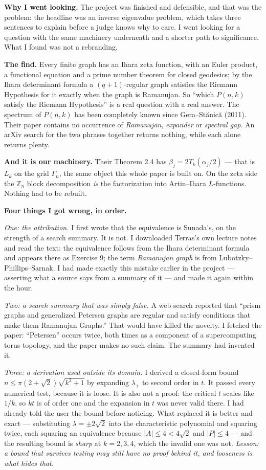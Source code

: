 \documentclass[12pt]{article}
\begin{document}
\textbf{Why I went looking.} The project was finished and defensible, and that
was the problem: the headline was an inverse eigenvalue problem, which takes
three sentences to explain before a judge knows why to care. I went looking for
a question with the same machinery underneath and a shorter path to
significance. What I found was not a rebranding.

\textbf{The find.} Every finite graph has an Ihara zeta function, with an Euler
product, a functional equation and a prime number theorem for closed geodesics;
by the Ihara determinant formula a $(q+1)$-regular graph satisfies the Riemann
Hypothesis for it exactly when the graph is Ramanujan. So ``which $P(n,k)$
satisfy the Riemann Hypothesis'' is a real question with a real answer. The
spectrum of $P(n,k)$ has been completely known since Gera--St\u{a}nic\u{a}
(2011). Their paper contains no occurrence of \emph{Ramanujan},
\emph{expander} or \emph{spectral gap}. An arXiv search for the two phrases
together returns nothing, while each alone returns plenty.

\textbf{And it is our machinery.} Their Theorem 2.4 has $\beta_j=2T_k(\alpha_j/2)$
--- that is $L_k$ on the grid $\Gamma_n$, the same object this whole paper is
built on. On the zeta side the $\mathbb Z_n$ block decomposition \emph{is} the
factorization into Artin--Ihara $L$-functions. Nothing had to be rebuilt.

\textbf{Four things I got wrong, in order.}

\emph{One: the attribution.} I first wrote that the equivalence is Sunada's,
on the strength of a search summary. It is not. I downloaded Terras's own
lecture notes and read the text: the equivalence follows from the Ihara
determinant formula and appears there as Exercise 9; the term
\emph{Ramanujan graph} is from Lubotzky--Phillips--Sarnak. I had made exactly
this mistake earlier in the project --- asserting what a source says from a
summary of it --- and made it again within the hour.

\emph{Two: a search summary that was simply false.} A web search reported that
``prism graphs and generalized Petersen graphs are regular and satisfy
conditions that make them Ramanujan Graphs.'' That would have killed the
novelty. I fetched the paper: ``Petersen'' occurs twice, both times as a
component of a supercomputing torus topology, and the paper makes no such claim.
The summary had invented it.

\emph{Three: a derivation used outside its domain.} I derived a closed-form
bound $n\le\pi(2+\sqrt2)\sqrt{k^2+1}$ by expanding $\lambda_+$ to second order
in $t$. It passed every numerical test, because it is loose. It is also not a
proof: the critical $t$ scales like $1/k$, so $kt$ is of order one and the
expansion in $t$ was never valid there. I had already told the user the bound
before noticing. What replaced it is better and exact --- substituting
$\lambda=\pm2\sqrt2$ into the characteristic polynomial and squaring twice,
each squaring an equivalence because $|A|\le4<4\sqrt2$ and $|P|\le4$ --- and
the resulting bound is \emph{sharp} at $k=2,3,4$, which the invalid one was not.
\emph{Lesson: a bound that survives testing may still have no proof behind it,
and looseness is what hides that.}
\end{document}
